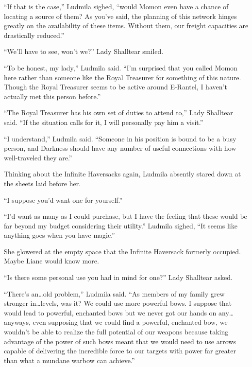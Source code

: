 “If that is the case,” Ludmila sighed, “would Momon even have a chance of locating a source of them? As you’ve said, the planning of this network hinges greatly on the availability of these items. Without them, our freight capacities are drastically reduced.”

 

“We’ll have to see, won’t we?” Lady Shalltear smiled.

 

“To be honest, my lady,” Ludmila said. “I’m surprised that you called Momon here rather than someone like the Royal Treasurer for something of this nature. Though the Royal Treasurer seems to be active around E-Rantel, I haven’t actually met this person before.”

 

“The Royal Treasurer has his own set of duties to attend to,” Lady Shalltear said. “If the situation calls for it, I will personally pay him a visit.”

 

“I understand,” Ludmila said. “Someone in his position is bound to be a busy person, and Darkness should have any number of useful connections with how well-traveled they are.”

 

Thinking about the Infinite Haversacks again, Ludmila absently stared down at the sheets laid before her.

 

“I suppose you’d want one for yourself.”

 

“I’d want as many as I could purchase, but I have the feeling that these would be far beyond my budget considering their utility.” Ludmila sighed, “It seems like anything goes when you have magic.”

 

She glowered at the empty space that the Infinite Haversack formerly occupied. Maybe Liane would know more.

 

“Is there some personal use you had in mind for one?” Lady Shalltear asked.

 

“There’s an…old problem,” Ludmila said. “As members of my family grew stronger in…levels, was it? We could use more powerful bows. I suppose that would lead to powerful, enchanted bows but we never got our hands on any…anyways, even supposing that we could find a powerful, enchanted bow, we wouldn’t be able to realize the full potential of our weapons because taking advantage of the power of such bows meant that we would need to use arrows capable of delivering the incredible force to our targets with power far greater than what a mundane warbow can achieve.”

